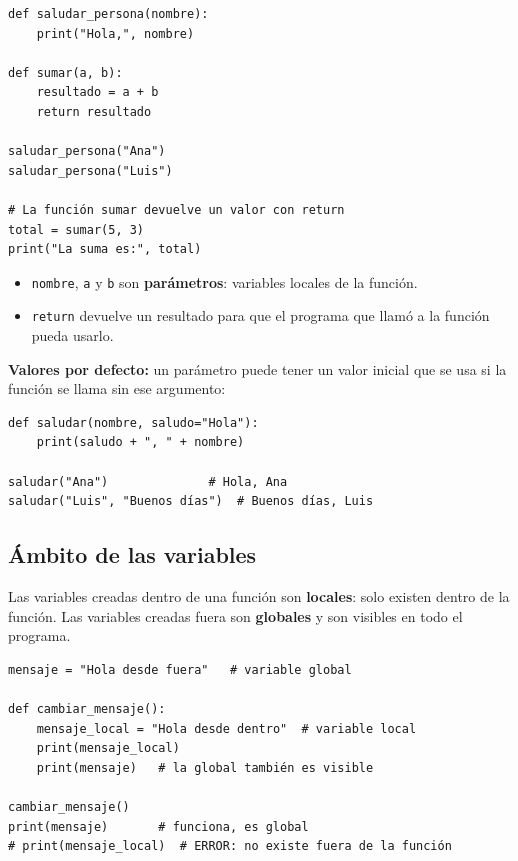 \documentclass[11pt,a4paper]{article}
\begin{document}
\begin{cajaEjemplo}
\begin{lstlisting}[style=pythonStyle, caption={Función con parámetros}]
def saludar_persona(nombre):
    print("Hola,", nombre)

def sumar(a, b):
    resultado = a + b
    return resultado

saludar_persona("Ana")
saludar_persona("Luis")

# La función sumar devuelve un valor con return
total = sumar(5, 3)
print("La suma es:", total)
\end{lstlisting}

\begin{itemize}
    \item \texttt{nombre}, \texttt{a} y \texttt{b} son \textbf{parámetros}: variables locales de la función.
    \item \texttt{return} devuelve un resultado para que el programa que llamó a la función pueda usarlo.
\end{itemize}
\end{cajaEjemplo}

\begin{cajaRecuerda}
\textbf{Valores por defecto:} un parámetro puede tener un valor inicial que se usa si la función se llama sin ese argumento:
\begin{lstlisting}[style=pythonStyle]
def saludar(nombre, saludo="Hola"):
    print(saludo + ", " + nombre)

saludar("Ana")              # Hola, Ana
saludar("Luis", "Buenos días")  # Buenos días, Luis
\end{lstlisting}
\end{cajaRecuerda}

\subsection{Ámbito de las variables}

Las variables creadas dentro de una función son \textbf{locales}: solo existen dentro de la función. Las variables creadas fuera son \textbf{globales} y son visibles en todo el programa.

\begin{cajaEjemplo}
\begin{lstlisting}[style=pythonStyle, caption={Variables locales y globales}]
mensaje = "Hola desde fuera"   # variable global

def cambiar_mensaje():
    mensaje_local = "Hola desde dentro"  # variable local
    print(mensaje_local)
    print(mensaje)   # la global también es visible

cambiar_mensaje()
print(mensaje)       # funciona, es global
# print(mensaje_local)  # ERROR: no existe fuera de la función
\end{lstlisting}
\end{cajaEjemplo}
\end{document}
